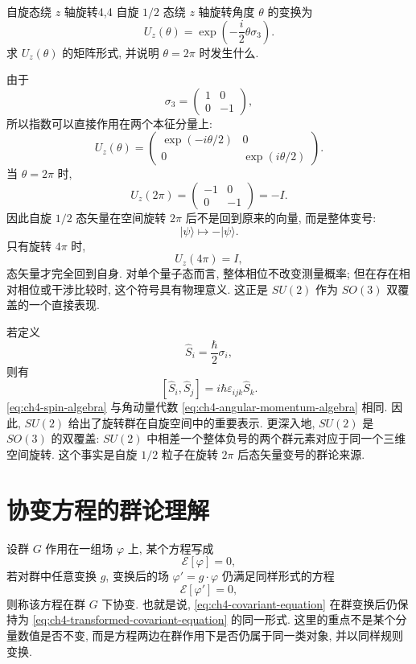 \begin{example}{自旋态绕 $z$ 轴旋转}{4,4}
自旋 $1/2$ 态绕 $z$ 轴旋转角度 $\theta$ 的变换为
\[
U_z(\theta)
=
\exp\left(-\frac{i}{2}\theta\sigma_3\right).
\]
求 $U_z(\theta)$ 的矩阵形式, 并说明 $\theta=2\pi$ 时发生什么. 
\begin{solution}
由于
\[
\sigma_3
=
\begin{pmatrix}
1&0\\
0&-1
\end{pmatrix},
\]
所以指数可以直接作用在两个本征分量上:
\[
U_z(\theta)
=
\begin{pmatrix}
\exp(-i\theta/2)&0\\
0&\exp(i\theta/2)
\end{pmatrix}.
\]
当 $\theta=2\pi$ 时,
\[
U_z(2\pi)
=
\begin{pmatrix}
-1&0\\
0&-1
\end{pmatrix}
=
-I.
\]
因此自旋 $1/2$ 态矢量在空间旋转 $2\pi$ 后不是回到原来的向量, 而是整体变号:
\[
|\psi\rangle\mapsto -|\psi\rangle.
\]
只有旋转 $4\pi$ 时,
\[
U_z(4\pi)
=
I,
\]
态矢量才完全回到自身. 对单个量子态而言, 整体相位不改变测量概率; 但在存在相对相位或干涉比较时, 这个符号具有物理意义. 这正是 $SU(2)$ 作为 $SO(3)$ 双覆盖的一个直接表现. 
\end{solution}
\end{example}

若定义
\[
\hat{S}_i=\frac{\hbar}{2}\sigma_i,
\]
则有
\begin{equation}
\label{eq:ch4-spin-algebra}
[\hat{S}_i,\hat{S}_j]
=
i\hbar\varepsilon_{ijk}\hat{S}_k.
\end{equation}
\eqref{eq:ch4-spin-algebra} 与角动量代数 \eqref{eq:ch4-angular-momentum-algebra} 相同. 因此, $SU(2)$ 给出了旋转群在自旋空间中的重要表示. 更深入地, $SU(2)$ 是 $SO(3)$ 的双覆盖: $SU(2)$ 中相差一个整体负号的两个群元素对应于同一个三维空间旋转. 这个事实是自旋 $1/2$ 粒子在旋转 $2\pi$ 后态矢量变号的群论来源. 

\section{协变方程的群论理解}

设群 $G$ 作用在一组场 $\varphi$ 上, 某个方程写成
\begin{equation}
\label{eq:ch4-covariant-equation}
\mathcal E[\varphi]=0,
\end{equation}
若对群中任意变换 $g$, 变换后的场 $\varphi'=g\cdot\varphi$ 仍满足同样形式的方程
\begin{equation}
\label{eq:ch4-transformed-covariant-equation}
\mathcal E[\varphi']=0,
\end{equation}
则称该方程在群 $G$ 下协变. 也就是说, \eqref{eq:ch4-covariant-equation} 在群变换后仍保持为 \eqref{eq:ch4-transformed-covariant-equation} 的同一形式. 这里的重点不是某个分量数值是否不变, 而是方程两边在群作用下是否仍属于同一类对象, 并以同样规则变换. 

